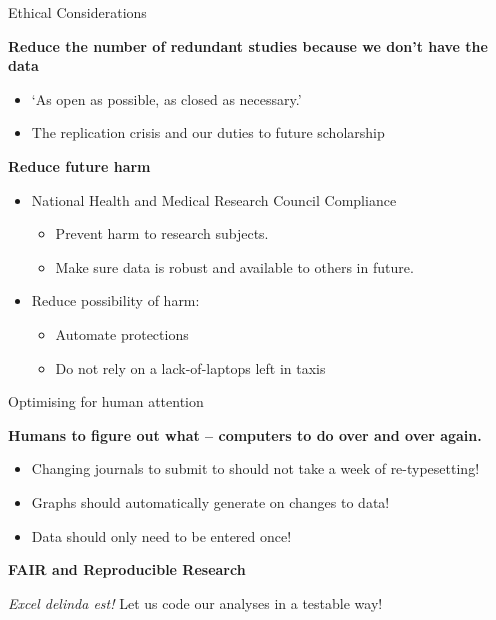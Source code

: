 \documentclass[aspectratio=1610, 11pt]{beamer} %
\begin{document}
\begin{frame}{Ethical Considerations}

\textbf{Reduce the number of redundant studies because we don't have the data}
\begin{itemize}
    \item `As open as possible, as closed as necessary.' \parencite{European_Commission2016-ai}
    \item The replication crisis and our duties to future scholarship \parencite{Hochstrasser2020-mr,  National_Academies_of_Sciences_Engineering_and_Medicine2019-da, Reed2014-aa, Franco2014-oy}
    \end{itemize}
\textbf{Reduce future harm}    
\begin{itemize}
    \item National Health and Medical Research Council Compliance
    \begin{itemize}
        \item Prevent harm to research subjects.
        \item Make sure data is robust and available to others in future.
    \end{itemize}
    \item Reduce possibility of harm:
    \begin{itemize}
        \item Automate protections
        \item Do not rely on a lack-of-laptops left in taxis
    \end{itemize}
    
    
\end{itemize}





\end{frame}

\begin{frame}{Optimising for human attention}


\textbf{Humans to figure out what -- computers to do over and over again.}

\begin{itemize}
    \item Changing journals to submit to should not take a week of re-typesetting!
    \item Graphs should automatically generate on changes to data! 
    \item Data should only need to be entered once!
\end{itemize}




\textbf{FAIR and Reproducible Research}

\textit{Excel delinda est!} Let us code our analyses in a testable way! \parencite{Krugman2013-ju, Ross2020-yg, Bruford2020-tw}
\end{frame}
\end{document}
